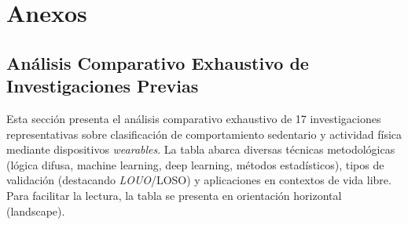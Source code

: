 
\chapter*{Anexos}


\section{Análisis Comparativo Exhaustivo de Investigaciones Previas}
\label{sec:anexo_tabla_completa}

Esta sección presenta el análisis comparativo exhaustivo de 17 investigaciones representativas sobre clasificación de comportamiento sedentario y actividad física mediante dispositivos \textit{wearables}. La tabla abarca diversas técnicas metodológicas (lógica difusa, machine learning, deep learning, métodos estadísticos), tipos de validación (destacando \textit{LOUO}/LOSO) y aplicaciones en contextos de vida libre. Para facilitar la lectura, la tabla se presenta en orientación horizontal (landscape).

